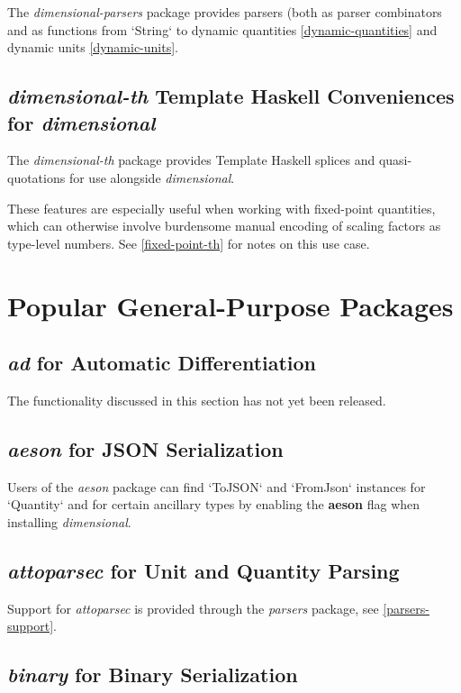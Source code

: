 \documentclass[11pt]{report}
\newcommand{\packagename}[1]{\textit{#1}}
\newcommand{\thispackage}{\packagename{dimensional}}
\newcommand{\flag}[1]{\textbf{#1}}
\newcommand{\prerelease}{\begin{framed}
The functionality discussed in this section has not yet been released.
\end{framed}}
\begin{document}
The \packagename{dimensional-parsers} package provides parsers (both as parser combinators and as functions from `String` to
dynamic quantities \ref{dynamic-quantities} and dynamic units \ref{dynamic-units}.


\subsection{\packagename{dimensional-th} Template Haskell Conveniences for \thispackage{}}

The \packagename{dimensional-th} package provides Template Haskell splices and quasi-quotations for use alongside \thispackage{}.

These features are especially useful when working with fixed-point quantities, which can otherwise involve burdensome manual encoding
of scaling factors as type-level numbers. See \ref{fixed-point-th} for notes on this use case.


\section{Popular General-Purpose Packages}

\subsection{\packagename{ad} for Automatic Differentiation}

\prerelease{}

\subsection{\packagename{aeson} for JSON Serialization}

Users of the \packagename{aeson} package can find `ToJSON`
and `FromJson` instances for `Quantity` and for certain ancillary types by
enabling the \flag{aeson} flag when installing \thispackage{}.

\subsection{\packagename{attoparsec} for Unit and Quantity Parsing}

Support for \packagename{attoparsec} is provided through the \packagename{parsers} package, see \ref{parsers-support}.

\subsection{\packagename{binary} for Binary Serialization}
\end{document}
